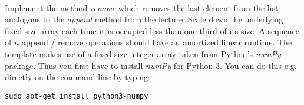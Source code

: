  \\
Implement the method \textit{remove} which removes the last element from the
list analogous to the \textit{append} method from the lecture.
Scale down the underlying fixed-size array each time it is occupied less than
one third of its size.
A sequence of $n$ append / remove operations should have an amortized linear
runtime. The template makes use of a fixed-size integer array taken 
from Python's \textit{numPy} package. Thus you first have to install \textit{numPy} for Python 3. You can do this e.g. directly on the command line by typing:

\texttt{sudo apt-get install python3-numpy}
